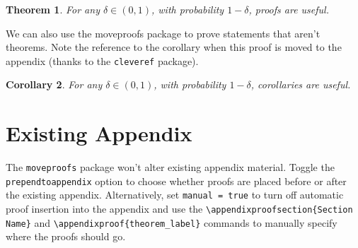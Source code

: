 \documentclass{article}
\newtheorem{theorem}{Theorem}
\newtheorem{corollary}[theorem]{Corollary}
\newtheorem{lemma}[theorem]{Lemma}
\begin{document}
\begin{theorem}\label{theorem_one}
For any $\delta \in (0, 1)$, with probability $1 - \delta$, proofs are useful.
\end{theorem}


\noindent We can also use the moveproofs package to prove statements that aren't theorems.
Note the reference to the corollary when this proof is moved to the appendix (thanks to the \texttt{cleveref} package).

\begin{corollary}\label{corollary_two}
For any $\delta \in (0, 1)$, with probability $1 - \delta$, corollaries are useful.
\end{corollary}


\appendix
\section{Existing Appendix}
The \texttt{moveproofs} package won't alter existing appendix material.
Toggle the \texttt{prependtoappendix} option to choose whether proofs are placed before or after the existing appendix.
Alternatively, set \texttt{manual = true} to turn off automatic proof insertion into the appendix and use the \texttt{\textbackslash appendixproofsection\{Section Name\}} and \texttt{\textbackslash appendixproof\{theorem\_label\}} commands to manually specify where the proofs should go.
\end{document}
